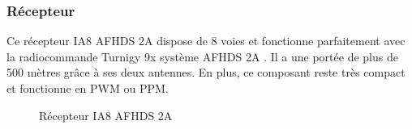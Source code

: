 \subsubsection{Récepteur }
Ce récepteur IA8 AFHDS 2A dispose de 8 voies et fonctionne parfaitement avec la radiocommande Turnigy 9x système AFHDS 2A \cite{Hobbyking}. Il a une portée de plus de 500 mètres  grâce à ses deux antennes. En plus, ce composant reste très compact et fonctionne en PWM ou PPM.
\begin{figure} [H]
	\begin{center}
		\centering
	\end{center}
	\caption{Récepteur IA8 AFHDS 2A}
\end{figure}
